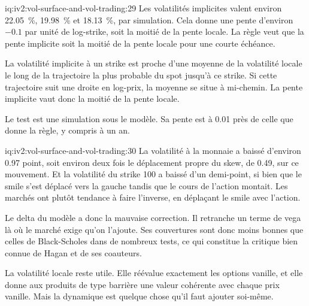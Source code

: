 \begin{solution}{iq:iv2:vol-surface-and-vol-trading:29}
Les volatilités implicites valent environ 22.05~\%, 19.98~\% et 18.13~\%, par simulation. Cela donne une pente d'environ $-0.1$ par unité de log-strike, soit la moitié de la pente locale. La règle veut que la pente implicite soit la moitié de la pente locale pour une courte échéance.

La volatilité implicite à un strike est proche d'une moyenne de la volatilité locale le long de la trajectoire la plus probable du spot jusqu'à ce strike. Si cette trajectoire suit une droite en log-prix, la moyenne se situe à mi-chemin. La pente implicite vaut donc la moitié de la pente locale.

Le test est une simulation sous le modèle. Sa pente est à 0.01 près de celle que donne la règle, y compris à un an.

\end{solution}

\begin{solution}{iq:iv2:vol-surface-and-vol-trading:30}
La volatilité à la monnaie a baissé d'environ 0.97 point, soit environ deux fois le déplacement propre du skew, de 0.49, sur ce mouvement. Et la volatilité du strike 100 a baissé d'un demi-point, si bien que le smile s'est déplacé vers la gauche tandis que le cours de l'action montait. Les marchés ont plutôt tendance à faire l'inverse, en déplaçant le smile avec l'action.

Le delta du modèle a donc la mauvaise correction. Il retranche un terme de vega là où le marché exige qu'on l'ajoute. Ses couvertures sont donc moins bonnes que celles de Black-Scholes dans de nombreux tests, ce qui constitue la critique bien connue de Hagan et de ses coauteurs.

La volatilité locale reste utile. Elle réévalue exactement les options vanille, et elle donne aux produits de type barrière une valeur cohérente avec chaque prix vanille. Mais la dynamique est quelque chose qu'il faut ajouter soi-même.

\end{solution}

